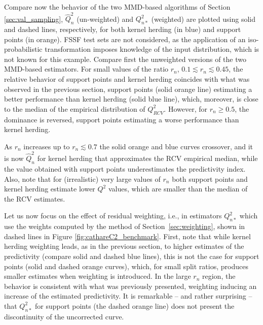 Compare now the behavior of the two MMD-based algorithms of Section \ref{sec:val_sampling}, $\widehat Q^2_n$ (un-weighted) and $Q_{n*}^2$ (weighted) are plotted using solid and dashed lines, respectively, for both kernel herding (in blue) and support points (in orange). 
FSSF test sets are not considered, as the application of an iso-probabilistic transformation imposes knowledge of the input distribution, which is not known for this example. 
Compare first the unweighted versions of the two MMD-based estimators. 
For small values of the ratio $r_n$, $0.1 \lesssim r_n \lesssim 0.45$, the relative behavior of support points and kernel herding coincides with what was observed in the previous section, 
support points (solid orange line) estimating a better performance than kernel herding (solid blue line), which, moreover, is close to the median of the empirical distribution of $Q^2_{RCV}$. 
However, for $r_n \geq 0.5$, the dominance is reversed, support points estimating a worse performance than kernel herding. 

As $r_n$ increases up to $r_n \lesssim 0.7$ the solid orange and blue curves crossover, and it is now $\widehat Q^2_n$ for kernel herding that approximates the RCV empirical median, while the value obtained with support points underestimates the predictivity index. 
Also, note that for (irrealistic) very large values of $r_n$ both support points and kernel herding estimate lower $Q^2$ values, which are smaller than the median of the RCV estimates.

Let us now focus on the effect of residual weighting, i.e., in estimators $Q_{n*}^2$ which use the weights computed by the method of Section~\ref{sec:weighting}, shown in dashed lines in Figure \ref{fig:cathareC2_benchmark}. 
First, note that while kernel herding weighting leads, as in the previous section, to higher estimates of the predictivity (compare solid and dashed blue lines), this is not the case for support points (solid and dashed orange curves), which, for small split ratios, produces smaller estimates when weighting is introduced. 
In the large $r_n$ region, the behavior is consistent with what was previously presented, weighting inducing an increase of the estimated predictivity. 
It is remarkable -- and rather surprising -- that $Q_{n*}^2$ for support points (the dashed orange line) does not present the discontinuity of the uncorrected curve. 

